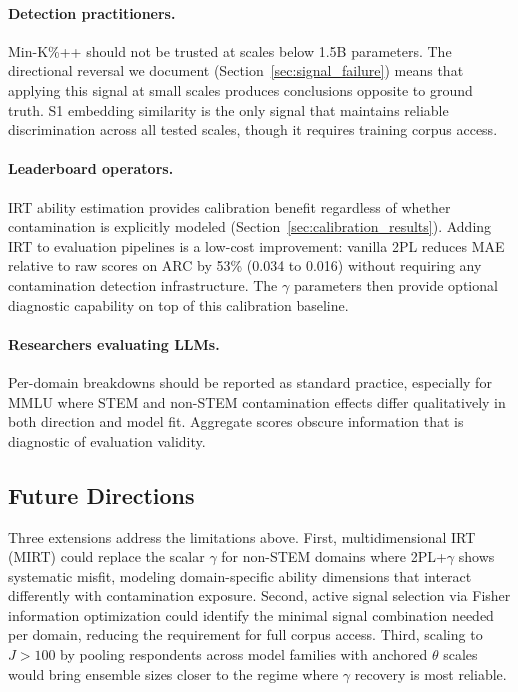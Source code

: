 \paragraph{Detection practitioners.}
Min-K\%++ should not be trusted at scales below 1.5B parameters. The directional reversal we document (Section~\ref{sec:signal_failure}) means that applying this signal at small scales produces conclusions opposite to ground truth. S1 embedding similarity is the only signal that maintains reliable discrimination across all tested scales, though it requires training corpus access.

\paragraph{Leaderboard operators.}
IRT ability estimation provides calibration benefit regardless of whether contamination is explicitly modeled (Section~\ref{sec:calibration_results}). Adding IRT to evaluation pipelines is a low-cost improvement: vanilla 2PL reduces MAE relative to raw scores on ARC by 53\% (0.034 to 0.016) without requiring any contamination detection infrastructure. The $\gamma$ parameters then provide optional diagnostic capability on top of this calibration baseline.

\paragraph{Researchers evaluating LLMs.}
Per-domain breakdowns should be reported as standard practice, especially for MMLU where STEM and non-STEM contamination effects differ qualitatively in both direction and model fit. Aggregate scores obscure information that is diagnostic of evaluation validity.

\subsection{Future Directions}
\label{sec:future}

Three extensions address the limitations above. First, multidimensional IRT (MIRT) could replace the scalar $\gamma$ for non-STEM domains where 2PL+$\gamma$ shows systematic misfit, modeling domain-specific ability dimensions that interact differently with contamination exposure. Second, active signal selection via Fisher information optimization could identify the minimal signal combination needed per domain, reducing the requirement for full corpus access. Third, scaling to $J > 100$ by pooling respondents across model families with anchored $\theta$ scales would bring ensemble sizes closer to the regime where $\gamma$ recovery is most reliable.
